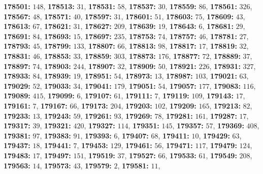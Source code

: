 \textsf{\bfseries 178501:} $148$, \textsf{\bfseries 178513:} $31$, \textsf{\bfseries 178531:} $58$, \textsf{\bfseries 178537:} $30$, \textsf{\bfseries 178559:} $86$, \textsf{\bfseries 178561:} $326$, \textsf{\bfseries 178567:} $48$, \textsf{\bfseries 178571:} $40$, \textsf{\bfseries 178597:} $31$, \textsf{\bfseries 178601:} $51$, \textsf{\bfseries 178603:} $75$, \textsf{\bfseries 178609:} $43$, \textsf{\bfseries 178613:} $67$, \textsf{\bfseries 178621:} $31$, \textsf{\bfseries 178627:} $209$, \textsf{\bfseries 178639:} $19$, \textsf{\bfseries 178643:} $6$, \textsf{\bfseries 178681:} $29$, \textsf{\bfseries 178691:} $84$, \textsf{\bfseries 178693:} $15$, \textsf{\bfseries 178697:} $235$, \textsf{\bfseries 178753:} $74$, \textsf{\bfseries 178757:} $46$, \textsf{\bfseries 178781:} $27$, \textsf{\bfseries 178793:} $45$, \textsf{\bfseries 178799:} $133$, \textsf{\bfseries 178807:} $66$, \textsf{\bfseries 178813:} $98$, \textsf{\bfseries 178817:} $17$, \textsf{\bfseries 178819:} $32$, \textsf{\bfseries 178831:} $46$, \textsf{\bfseries 178853:} $33$, \textsf{\bfseries 178859:} $303$, \textsf{\bfseries 178873:} $176$, \textsf{\bfseries 178877:} $72$, \textsf{\bfseries 178889:} $37$, \textsf{\bfseries 178897:} $74$, \textsf{\bfseries 178903:} $244$, \textsf{\bfseries 178907:} $32$, \textsf{\bfseries 178909:} $50$, \textsf{\bfseries 178921:} $226$, \textsf{\bfseries 178931:} $327$, \textsf{\bfseries 178933:} $84$, \textsf{\bfseries 178939:} $19$, \textsf{\bfseries 178951:} $54$, \textsf{\bfseries 178973:} $13$, \textsf{\bfseries 178987:} $103$, \textsf{\bfseries 179021:} $63$, \textsf{\bfseries 179029:} $52$, \textsf{\bfseries 179033:} $34$, \textsf{\bfseries 179041:} $179$, \textsf{\bfseries 179051:} $54$, \textsf{\bfseries 179057:} $177$, \textsf{\bfseries 179083:} $116$, \textsf{\bfseries 179089:} $415$, \textsf{\bfseries 179099:} $6$, \textsf{\bfseries 179107:} $61$, \textsf{\bfseries 179111:} $7$, \textsf{\bfseries 179119:} $109$, \textsf{\bfseries 179143:} $17$, \textsf{\bfseries 179161:} $7$, \textsf{\bfseries 179167:} $66$, \textsf{\bfseries 179173:} $204$, \textsf{\bfseries 179203:} $102$, \textsf{\bfseries 179209:} $165$, \textsf{\bfseries 179213:} $82$, \textsf{\bfseries 179233:} $13$, \textsf{\bfseries 179243:} $59$, \textsf{\bfseries 179261:} $93$, \textsf{\bfseries 179269:} $78$, \textsf{\bfseries 179281:} $161$, \textsf{\bfseries 179287:} $17$, \textsf{\bfseries 179317:} $39$, \textsf{\bfseries 179321:} $420$, \textsf{\bfseries 179327:} $114$, \textsf{\bfseries 179351:} $145$, \textsf{\bfseries 179357:} $57$, \textsf{\bfseries 179369:} $408$, \textsf{\bfseries 179381:} $97$, \textsf{\bfseries 179383:} $91$, \textsf{\bfseries 179393:} $6$, \textsf{\bfseries 179407:} $68$, \textsf{\bfseries 179411:} $10$, \textsf{\bfseries 179429:} $63$, \textsf{\bfseries 179437:} $18$, \textsf{\bfseries 179441:} $7$, \textsf{\bfseries 179453:} $129$, \textsf{\bfseries 179461:} $56$, \textsf{\bfseries 179471:} $117$, \textsf{\bfseries 179479:} $124$, \textsf{\bfseries 179483:} $17$, \textsf{\bfseries 179497:} $151$, \textsf{\bfseries 179519:} $37$, \textsf{\bfseries 179527:} $66$, \textsf{\bfseries 179533:} $61$, \textsf{\bfseries 179549:} $208$, \textsf{\bfseries 179563:} $14$, \textsf{\bfseries 179573:} $43$, \textsf{\bfseries 179579:} $2$, \textsf{\bfseries 179581:} $11$, 
